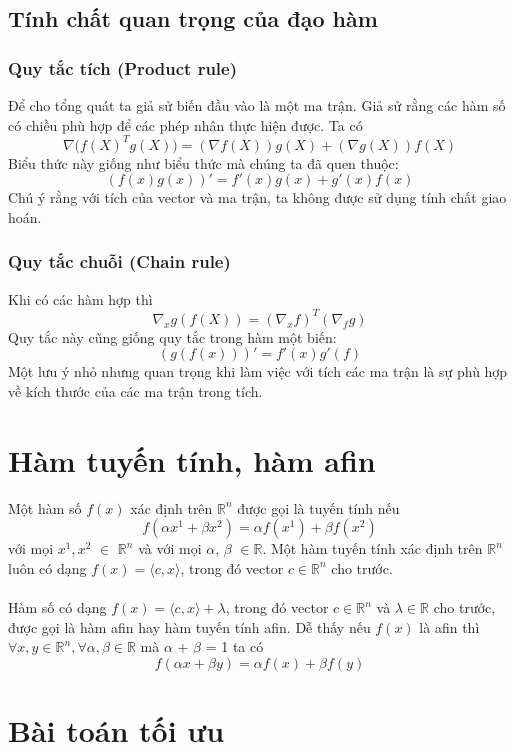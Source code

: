\documentclass[12pt,a4paper]{report}
\begin{document}
\subsection{Tính chất quan trọng của đạo hàm}
\subsubsection{Quy tắc tích (Product rule)} Để cho tổng quát ta giả sử biến đầu vào là một ma trận. Giả sử rằng các hàm số có chiều phù hợp để các phép nhân thực hiện được. Ta có \begin{equation}
	\nabla\big(f(X)^Tg(X)\big) = (\nabla f(X))g(X) + (\nabla g(X))f(X)
\end{equation} Biểu thức này giống như biểu thức mà chúng ta đã quen thuộc: $$(f(x)g(x))' = f'(x)g(x) + g'(x)f(x)$$ Chú ý rằng với tích của vector và ma trận, ta không được sử dụng tính chất giao hoán.\subsubsection{Quy tắc chuỗi (Chain rule)}
Khi có các hàm hợp thì \begin{equation}
	\nabla_xg(f(X)) = (\nabla_xf)^T(\nabla_fg)
\end{equation} Quy tắc này cũng giống quy tắc trong hàm một biến: $$(g(f(x)))' = f'(x)g'(f)$$ Một lưu ý nhỏ nhưng quan trọng khi làm việc với tích các ma trận là sự phù hợp về kích thước của các ma trận trong tích.

\section{Hàm tuyến tính, hàm afin}
Một hàm số $f(x)$ xác định trên $\mathbb{R}^n$ được gọi là tuyến tính nếu $$f(\alpha x^1 + \beta x^2) = \alpha f(x^1) + \beta f(x^2)$$ với mọi $x^1, x^2$ $\in$ $\mathbb{R}^n$ và với mọi $\alpha$, $\beta$ $\in \mathbb{R}$. Một hàm tuyến tính xác định trên $\mathbb{R}^n$ luôn có dạng $f(x) = \langle c, x \rangle$, trong đó vector $c \in \mathbb{R}^n$ cho trước. \\\\
Hàm số có dạng $f(x) = \langle c, x \rangle + \lambda$, trong đó vector $c \in \mathbb{R}^n$ và $\lambda \in \mathbb{R}$ cho trước, được gọi là hàm afin hay hàm tuyến tính afin. Dễ thấy nếu $f(x)$ là afin thì $\forall x, y \in \mathbb{R}^n, \forall \alpha, \beta \in \mathbb{R}$ mà  $\alpha$ + $\beta$ = 1 ta có $$f(\alpha x + \beta y) = \alpha f(x) + \beta f(y)$$

\section{Bài toán tối ưu}
\end{document}
